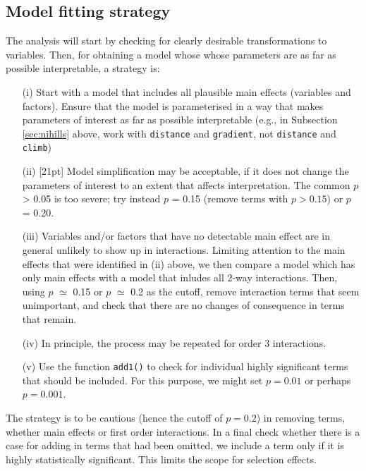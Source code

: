 \documentclass{tufte-book}\usepackage[]{graphicx}\usepackage[]{color}
\newcommand{\txtt}[1]{\texttt{#1}}
\begin{document}
\subsection{Model fitting strategy}

The analysis will start by checking for clearly desirable
transformations to variables.  Then, for obtaining a model whose
whose parameters are as far as possible interpretable, a strategy
is:
 \begin{itemize}
 \item[(i)] Start with a model that includes all plausible main effects
   (variables and factors).  Ensure that the model is parameterised in
   a way that makes parameters of interest as far as possible
   interpretable (e.g., in Subsection \ref{sec:nihills} above, work
   with \texttt{distance} and \texttt{gradient}, not \texttt{distance}
   and \texttt{climb})
 \item[(ii)]
 [21pt]
   Model simplification may be acceptable, if it does not
   change the parameters of interest to an extent that affects
   interpretation. The common $p$ > 0.05 is too
   severe; try instead
   $p$ = 0.15 (remove terms with $p > 0.15$) or $p$ = 0.20.
 \item[(iii)] Variables and/or factors that have no detectable main
   effect are in general unlikely to show up in interactions.
   Limiting attention to the main effects that were identified in (ii)
   above, we then compare a model which has only main effects with a
   model that inludes all 2-way interactions. Then, using $p$ $\simeq$
   0.15 or $p$ $\simeq$ 0.2 as the cutoff, remove interaction terms
   that seem unimportant, and check that there are no changes of
   consequence in terms that remain.
 \item[(iv)] In principle, the process may be repeated for order 3
   interactions.
\item[(v)] Use the function \txtt{add1()} to check for individual
highly significant terms that should be included.  For this purpose,
we might set $p=0.01$ or perhaps $p=0.001$.
\end{itemize}
The strategy is to be cautious (hence the cutoff of $p=0.2$) in
removing terms, whether main effects or first order interactions.
In a final check whether there is a case for adding in terms that
had been omitted, we include a term only if it is highly statistically
significant.  This limits the scope for selection effects.
\end{document}
